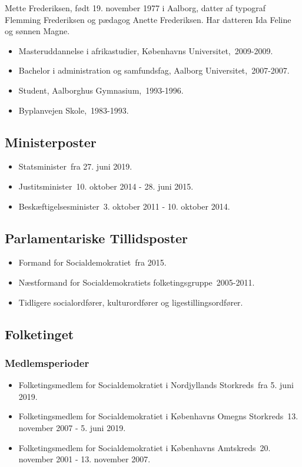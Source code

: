 \documentclass[11pt, a4paper]{awesome-cv}
\begin{document}
\makecvheader[R]
\makelettertitle
\begin{cvletter}
Mette Frederiksen, født 19. november 1977 i Aalborg, datter af typograf Flemming Frederiksen og pædagog Anette Frederiksen. Har datteren Ida Feline og sønnen Magne.

\begin{itemize}
\item Masteruddannelse i afrikastudier, Københavns Universitet, 2009-2009.
\item Bachelor i administration og samfundsfag, Aalborg Universitet, 2007-2007.
\item Student, Aalborghus Gymnasium, 1993-1996.
\item Byplanvejen Skole, 1983-1993.
\end{itemize}
\subsection*{Ministerposter}
\begin{itemize}
\item Statsminister fra 27. juni 2019.
\item Justitsminister 10. oktober 2014 - 28. juni 2015.
\item Beskæftigelsesminister 3. oktober 2011 - 10. oktober 2014.
\end{itemize}
\subsection*{Parlamentariske Tillidsposter}
\begin{itemize}
\item Formand for Socialdemokratiet fra 2015.
\item Næstformand for Socialdemokratiets folketingsgruppe 2005-2011.
\item Tidligere socialordfører, kulturordfører og ligestillingsordfører.
\end{itemize}
\subsection*{Folketinget}
\subsubsection*{Medlemsperioder}
\begin{itemize}
\item Folketingsmedlem for Socialdemokratiet i Nordjyllands Storkreds fra 5. juni 2019.
\item Folketingsmedlem for Socialdemokratiet i Københavns Omegns Storkreds 13. november 2007 - 5. juni 2019.
\item Folketingsmedlem for Socialdemokratiet i Københavns Amtskreds 20. november 2001 - 13. november 2007.
\end{itemize}

\end{cvletter}
\end{document}
